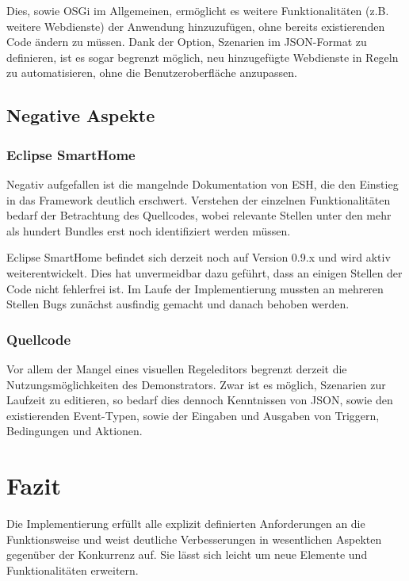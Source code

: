 Dies, sowie OSGi im Allgemeinen, ermöglicht es weitere Funktionalitäten (z.B. weitere Webdienste) der Anwendung hinzuzufügen, ohne bereits existierenden Code ändern zu müssen. Dank der Option, Szenarien im JSON-Format zu definieren, ist es sogar begrenzt möglich, neu hinzugefügte Webdienste in Regeln zu automatisieren, ohne die Benutzeroberfläche anzupassen.

\subsection{Negative Aspekte}
\subsubsection{Eclipse SmartHome}
Negativ aufgefallen ist die mangelnde Dokumentation von ESH, die den Einstieg in das Framework deutlich erschwert. Verstehen der einzelnen Funktionalitäten bedarf der Betrachtung des Quellcodes, wobei relevante Stellen unter den mehr als hundert Bundles erst noch identifiziert werden müssen. 

Eclipse SmartHome befindet sich derzeit noch auf Version 0.9.x und wird aktiv weiterentwickelt. Dies hat unvermeidbar dazu geführt, dass an einigen Stellen der Code nicht fehlerfrei ist. Im Laufe der Implementierung mussten an mehreren Stellen Bugs zunächst ausfindig gemacht und danach behoben werden.

\subsubsection{Quellcode}
Vor allem der Mangel eines visuellen Regeleditors begrenzt derzeit die Nutzungsmöglichkeiten des Demonstrators. Zwar ist es möglich, Szenarien zur Laufzeit zu editieren, so bedarf dies dennoch Kenntnissen von JSON, sowie den existierenden Event-Typen, sowie der Eingaben und Ausgaben von Triggern, Bedingungen und Aktionen.

\section{Fazit}
Die Implementierung erfüllt alle explizit definierten Anforderungen an die Funktionsweise und weist deutliche Verbesserungen in wesentlichen Aspekten gegenüber der Konkurrenz auf. Sie lässt sich leicht um neue Elemente und Funktionalitäten erweitern.


